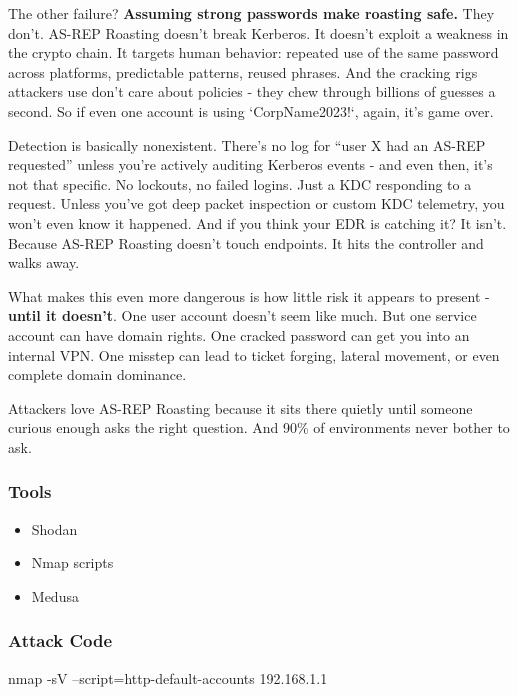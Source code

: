 The other failure? \textbf{Assuming strong passwords make roasting safe. }They don’t. AS-REP Roasting doesn’t break Kerberos. It doesn’t exploit a weakness in the crypto chain. It targets human behavior: repeated use of the same password across platforms, predictable patterns, reused phrases. And the cracking rigs attackers use don’t care about policies - they chew through billions of guesses a second. So if even one account is using `CorpName2023!`, again, it’s game over.

Detection is basically nonexistent. There’s no log for “user X had an AS-REP requested” unless you’re actively auditing Kerberos events - and even then, it’s not that specific. No lockouts, no failed logins. Just a KDC responding to a request. Unless you’ve got deep packet inspection or custom KDC telemetry, you won’t even know it happened. And if you think your EDR is catching it? It isn’t. Because AS-REP Roasting doesn't touch endpoints. It hits the controller and walks away.

What makes this even more dangerous is how little risk it appears to present - \textbf{until it doesn’t}. One user account doesn’t seem like much. But one service account can have domain rights. One cracked password can get you into an internal VPN. One misstep can lead to ticket forging, lateral movement, or even complete domain dominance.

Attackers love AS-REP Roasting because it sits there quietly until someone curious enough asks the right question. And 90\% of environments never bother to ask.
\subsubsection{\textbf{Tools}}

\begin{itemize}
    \item Shodan

    \item Nmap scripts

    \item Medusa

\end{itemize}

\subsubsection{\textbf{Attack Code}}

nmap -sV --script=http-default-accounts 192.168.1.1

